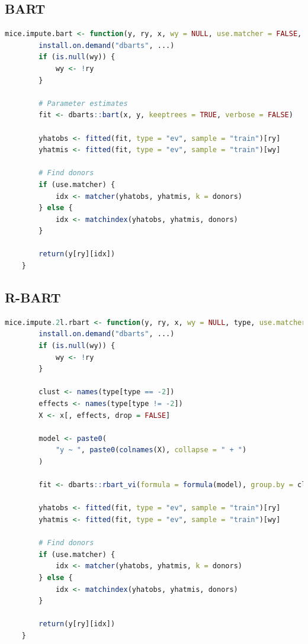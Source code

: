 \documentclass[3p,12pt,a4paper]{elsarticle}
\begin{document}
\subsection{BART}
\begin{lstlisting}[language=R, caption = {Imputation function for single-level BART}, label = {lst:singlelevelBART}]
    mice.impute.bart <- function(y, ry, x, wy = NULL, use.matcher = FALSE, donors = 5L, ...) {
        install.on.demand("dbarts", ...)
        if (is.null(wy)) {
            wy <- !ry
        }
    
        # Parameter estimates
        fit <- dbarts::bart(x, y, keeptrees = TRUE, verbose = FALSE)
    
        yhatobs <- fitted(fit, type = "ev", sample = "train")[ry]
        yhatmis <- fitted(fit, type = "ev", sample = "train")[wy]
    
        # Find donors
        if (use.matcher) {
            idx <- matcher(yhatobs, yhatmis, k = donors)
        } else {
            idx <- matchindex(yhatobs, yhatmis, donors)
        }
    
        return(y[ry][idx])
    }
\end{lstlisting}
\subsection{R-BART}
\begin{lstlisting}[language=R, caption={Imputation function for random intercept BART}, label={lst:randominterceptBART}]
    mice.impute.2l.rbart <- function(y, ry, x, wy = NULL, type, use.matcher = FALSE, donors = 5L, ...) {
        install.on.demand("dbarts", ...)
        if (is.null(wy)) {
            wy <- !ry
        }
    
        clust <- names(type[type == -2])
        effects <- names(type[type != -2])
        X <- x[, effects, drop = FALSE]
    
        model <- paste0(
            "y ~ ", paste0(colnames(X), collapse = " + ")
        )
    
        fit <- dbarts::rbart_vi(formula = formula(model), group.by = clust, data = data.frame(y, x), verbose = FALSE, n.threads = 1, n.samples = 500L, n.burn = 500L, ...)
    
        yhatobs <- fitted(fit, type = "ev", sample = "train")[ry]
        yhatmis <- fitted(fit, type = "ev", sample = "train")[wy]
    
        # Find donors
        if (use.matcher) {
            idx <- matcher(yhatobs, yhatmis, k = donors)
        } else {
            idx <- matchindex(yhatobs, yhatmis, donors)
        }
    
        return(y[ry][idx])
    }
\end{lstlisting}
\end{document}
